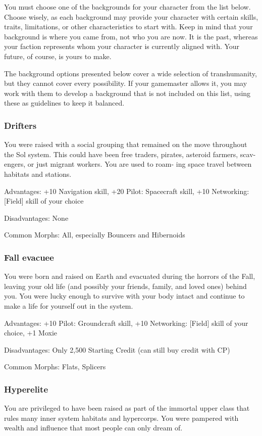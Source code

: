  You must choose one of the backgrounds for your
 character from the list below. Choose wisely, as each
 background may provide your character with certain
 skills, traits, limitations, or other characteristics to
 start with. Keep in mind that your background is
 where you came from, not who you are now. It is
 the past, whereas your faction represents whom your
 character is currently aligned with. Your future, of
 course, is yours to make.

 The background options presented below cover a
 wide selection of transhumanity, but they cannot cover
 every possibility. If your gamemaster allows it, you
 may work with them to develop a background that is
 not included on this list, using these as guidelines to
 keep it balanced.

\subsubsection{Drifters}
 You were raised with a social grouping that remained
 on the move throughout the Sol system. This could
 have been free traders, pirates, asteroid farmers, scav-
 engers, or just migrant workers. You are used to roam-
 ing space travel between habitats and stations.
 
 Advantages: +10 Navigation skill, +20 Pilot: Spacecraft
 skill, +10 Networking: [Field] skill of your choice

 Disadvantages: None

 Common Morphs: All, especially Bouncers and Hibernoids

\subsubsection{Fall evacuee} %
 You were born and raised on Earth and evacuated
 during the horrors of the Fall, leaving your old life
 (and possibly your friends, family, and loved ones)
 behind you. You were lucky enough to survive with
 your body intact and continue to make a life for yourself out in the system.

 Advantages: +10 Pilot: Groundcraft skill, +10 Networking: [Field] skill of your choice, +1 Moxie

 Disadvantages: Only 2,500 Starting Credit (can still buy credit with CP)

 Common Morphs: Flats, Splicers

\subsubsection{Hyperelite} %
 You are privileged to have been raised as part of the
 immortal upper class that rules many inner system
 habitats and hypercorps. You were pampered with
 wealth and influence that most people can only
 dream of.

